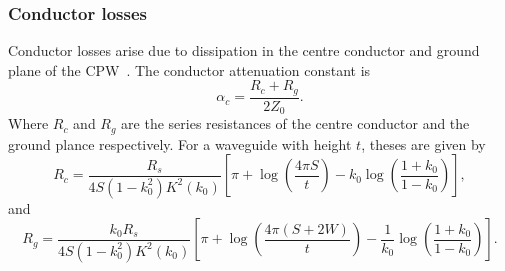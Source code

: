 \subsubsection{Conductor losses}

Conductor losses arise due to dissipation in the centre conductor and ground
plane of the CPW~\cite{Simons2004}.
The conductor attenuation constant is
\begin{equation}
  \alpha_c = \frac{R_c +R_g}{2Z_0}.
\end{equation}
Where $R_c$ and $R_g$ are the series resistances of the centre conductor and
the ground plance respectively.
For a waveguide with height 
$t$, theses are given by
\begin{equation}
  R_c = \frac{R_s}{4 S(1-k_0^2)K^2(k_0)}\left[ \pi + \log\left(\frac{4\pi
  S}{t}\right) - k_0\log\left(\frac{1+k_0}{1-k_0}\right) \right],
\end{equation}
and
\begin{equation}
  R_g = \frac{k_0 R_s}{4S(1-k_0^2)K^2(k_0)}\left[\pi +
  \log\left(\frac{4\pi(S+2W)}{t}\right) -
  \frac{1}{k_0}\log\left(\frac{1+k_0}{1-k_0}\right)\right].
\end{equation}

%
%

